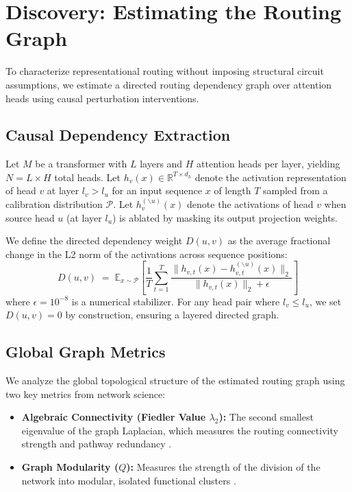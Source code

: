 \documentclass[11pt,a4paper]{article}
\newcommand{\E}{\mathbb{E}}
\theoremstyle{definition}
\theoremstyle{plain}
\begin{document}
\section{Discovery: Estimating the Routing Graph}
\label{sec:discovery}

To characterize representational routing without imposing structural circuit assumptions, we estimate a directed routing dependency graph over attention heads using causal perturbation interventions.

\subsection{Causal Dependency Extraction}
Let $M$ be a transformer with $L$ layers and $H$ attention heads per layer, yielding $N = L \times H$ total heads. Let $h_v(x) \in \mathbb{R}^{T \times d_h}$ denote the activation representation of head $v$ at layer $l_v > l_u$ for an input sequence $x$ of length $T$ sampled from a calibration distribution $\mathcal{P}$. Let $h_v^{(\backslash u)}(x)$ denote the activations of head $v$ when source head $u$ (at layer $l_u$) is ablated by masking its output projection weights. 

We define the directed dependency weight $D(u, v)$ as the average fractional change in the L2 norm of the activations across sequence positions:
\begin{equation}
    D(u, v) \;=\; \E_{x \sim \mathcal{P}} \left[ \frac{1}{T} \sum_{t=1}^T \frac{\|h_{v, t}(x) - h_{v, t}^{(\backslash u)}(x)\|_2}{\|h_{v, t}(x)\|_2 + \epsilon} \right]
    \label{eq:dependency}
\end{equation}
where $\epsilon = 10^{-8}$ is a numerical stabilizer. For any head pair where $l_v \le l_u$, we set $D(u, v) = 0$ by construction, ensuring a layered directed graph.

\subsection{Global Graph Metrics}
We analyze the global topological structure of the estimated routing graph using two key metrics from network science:
\begin{itemize}
    \item \textbf{Algebraic Connectivity (Fiedler Value $\lambda_2$):} The second smallest eigenvalue of the graph Laplacian, which measures the routing connectivity strength and pathway redundancy \citep{fiedler1973algebraic}.
    \item \textbf{Graph Modularity ($Q$):} Measures the strength of the division of the network into modular, isolated functional clusters \citep{newman2006modularity}.
\end{itemize}
\end{document}
